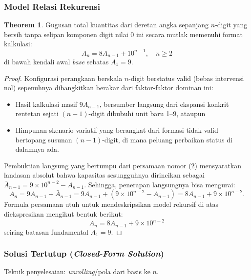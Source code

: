 \documentclass[12pt,a4paper]{article}
\theoremstyle{definition}
\newtheorem{theorem}{Theorem}[section]
\begin{document}
\subsubsection{Model Relasi Rekurensi}

\begin{theorem}
  Gugusan total kuantitas dari deretan angka sepanjang $n$-digit yang bersih 
  tanpa selipan komponen digit nilai 0 ini secara mutlak memenuhi format kalkulasi:
  \begin{equation}
    A_n = 8A_{n-1} + 10^{n-1}, \quad n \geq 2
  \end{equation}
  di bawah kendali awal \emph{base} sebatas $A_1 = 9$.
\end{theorem}

\begin{proof}
  Konfigurasi perangkaan berskala $n$-digit berstatus valid (bebas intervensi nol) 
  sepenuhnya dibangkitkan berakar dari faktor-faktor dominan ini:
  \begin{itemize}
    \item Hasil kalkulasi masif $9A_{n-1}$, bersumber langsung dari ekspansi konkrit
          rentetan sejati $(n-1)$-digit dibubuhi unit baru 1--9, ataupun 
    \item Himpunan skenario variatif yang berangkat dari formasi tidak valid bertopang 
          susunan $(n-1)$-digit, di mana peluang perbaikan status di dalamnya ada.
  \end{itemize}
  Pembuktian langsung yang bertumpu dari persamaan nomor (2) mensyaratkan landasan absolut bahwa 
  kapasitas sesungguhnya dirincikan sebagai $\bar{A}_{n-1} = 9 \times 10^{n-2} - A_{n-1}$. 
  Sehingga, penerapan langsungnya bisa mengurai:
  \[
    A_n = 9A_{n-1} + \bar{A}_{n-1}
        = 9A_{n-1} + (9 \times 10^{n-2} - A_{n-1})
        = 8A_{n-1} + 9 \times 10^{n-2}.
  \]
  Formula persamaan utuh untuk mendeskripsikan model rekursif di atas diekspresikan 
  mengikut bentuk berikut:
  \begin{equation}
    A_n = 8A_{n-1} + 9 \times 10^{n-2}
  \end{equation}
  seiring batasan fundamental $A_1 = 9$.
\end{proof}

\subsubsection{Solusi Tertutup (\textit{Closed-Form Solution})}

Teknik penyelesaian: \emph{unrolling}/pola dari basis ke $n$.
\end{document}
